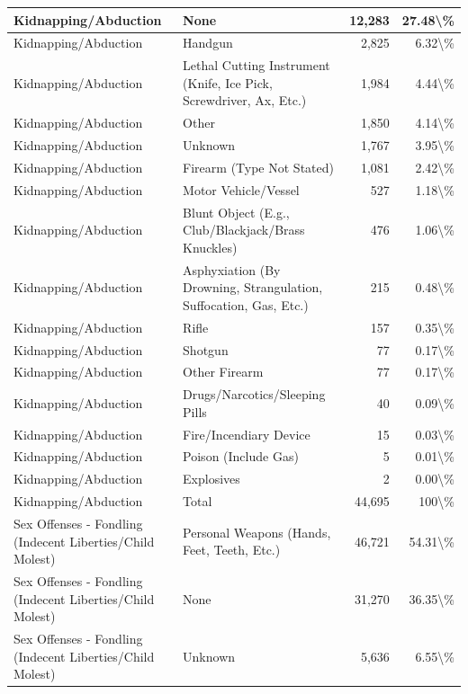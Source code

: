 \documentclass[
]{krantz}
\begin{document}
\begin{longtable}[t]{l|l|r|r}
\hline
Kidnapping/Abduction & None & 12,283 & 27.48\textbackslash{}\%\\
\hline
Kidnapping/Abduction & Handgun & 2,825 & 6.32\textbackslash{}\%\\
\hline
Kidnapping/Abduction & Lethal Cutting Instrument (Knife, Ice Pick, Screwdriver, Ax, Etc.) & 1,984 & 4.44\textbackslash{}\%\\
\hline
Kidnapping/Abduction & Other & 1,850 & 4.14\textbackslash{}\%\\
\hline
Kidnapping/Abduction & Unknown & 1,767 & 3.95\textbackslash{}\%\\
\hline
Kidnapping/Abduction & Firearm (Type Not Stated) & 1,081 & 2.42\textbackslash{}\%\\
\hline
Kidnapping/Abduction & Motor Vehicle/Vessel & 527 & 1.18\textbackslash{}\%\\
\hline
Kidnapping/Abduction & Blunt Object (E.g., Club/Blackjack/Brass Knuckles) & 476 & 1.06\textbackslash{}\%\\
\hline
Kidnapping/Abduction & Asphyxiation (By Drowning, Strangulation, Suffocation, Gas, Etc.) & 215 & 0.48\textbackslash{}\%\\
\hline
Kidnapping/Abduction & Rifle & 157 & 0.35\textbackslash{}\%\\
\hline
Kidnapping/Abduction & Shotgun & 77 & 0.17\textbackslash{}\%\\
\hline
Kidnapping/Abduction & Other Firearm & 77 & 0.17\textbackslash{}\%\\
\hline
Kidnapping/Abduction & Drugs/Narcotics/Sleeping Pills & 40 & 0.09\textbackslash{}\%\\
\hline
Kidnapping/Abduction & Fire/Incendiary Device & 15 & 0.03\textbackslash{}\%\\
\hline
Kidnapping/Abduction & Poison (Include Gas) & 5 & 0.01\textbackslash{}\%\\
\hline
Kidnapping/Abduction & Explosives & 2 & 0.00\textbackslash{}\%\\
\hline
Kidnapping/Abduction & Total & 44,695 & 100\textbackslash{}\%\\
\hline
Sex Offenses - Fondling (Indecent Liberties/Child Molest) & Personal Weapons (Hands, Feet, Teeth, Etc.) & 46,721 & 54.31\textbackslash{}\%\\
\hline
Sex Offenses - Fondling (Indecent Liberties/Child Molest) & None & 31,270 & 36.35\textbackslash{}\%\\
\hline
Sex Offenses - Fondling (Indecent Liberties/Child Molest) & Unknown & 5,636 & 6.55\textbackslash{}\%\\

\end{longtable}
\end{document}
